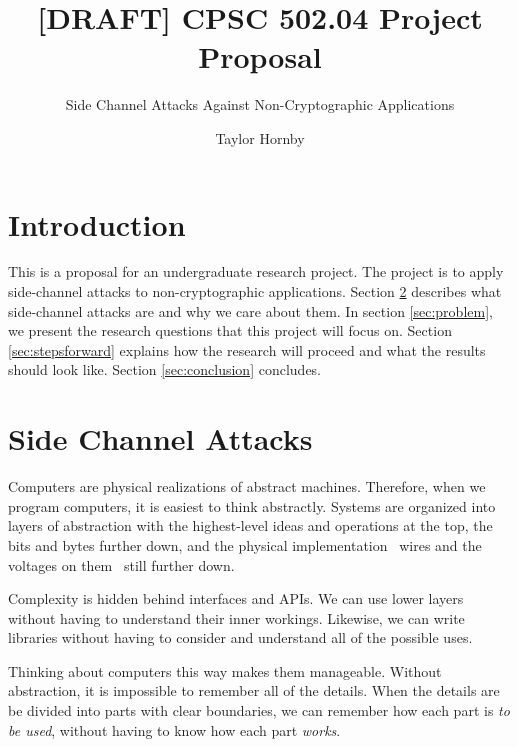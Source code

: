 \documentclass{acm_proc_article-sp}
\begin{document}
\sloppy

\title{[DRAFT] CPSC 502.04 Project Proposal}
\subtitle{Side Channel Attacks Against Non-Cryptographic Applications}


\author{
\alignauthor
Taylor Hornby
}

\maketitle

\section{Introduction}

This is a proposal for an undergraduate research project. The project is to
apply side-channel attacks to non-cryptographic applications. Section
\ref{sec:attacks} describes what side-channel attacks are and why we care about
them. In section \ref{sec:problem}, we present the research questions that this
project will focus on. Section \ref{sec:stepsforward} explains how the research
will proceed and what the results should look like. Section \ref{sec:conclusion}
concludes.

\section{Side Channel Attacks}
\label{sec:attacks}

Computers are physical realizations of abstract machines. Therefore, when we
program computers, it is easiest to think abstractly. Systems are organized into
layers of abstraction with the highest-level ideas and operations at the top,
the bits and bytes further down, and the physical implementation \textendash\
wires and the voltages on them \textendash\ still further down.

Complexity is hidden behind interfaces and APIs. We can use lower layers without
having to understand their inner workings. Likewise, we can write libraries
without having to consider and understand all of the possible uses.

Thinking about computers this way makes them manageable. Without abstraction, it
is impossible to remember all of the details. When the details are be divided
into parts with clear boundaries, we can remember how each part is \emph{to be
used}, without having to know how each part \emph{works}.
\end{document}
